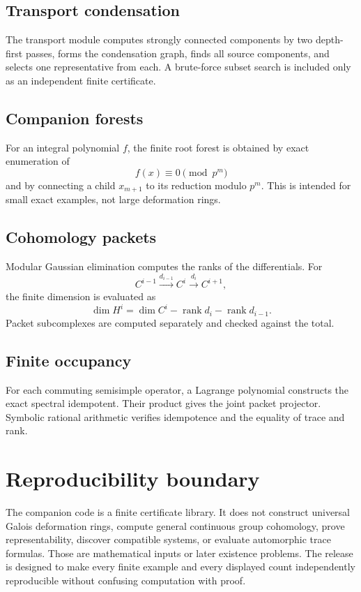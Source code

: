 \documentclass[11pt]{article}
\theoremstyle{definition}
\theoremstyle{remark}
\newcommand{\rank}{\operatorname{rank}}
\begin{document}
\subsection{Transport condensation}

The transport module computes strongly connected components by two depth-first passes, forms the condensation graph, finds all source components, and selects one representative from each.  A brute-force subset search is included only as an independent finite certificate.

\subsection{Companion forests}

For an integral polynomial \(f\), the finite root forest is obtained by exact enumeration of
\[
f(x)\equiv0\pmod{p^m}
\]
and by connecting a child \(x_{m+1}\) to its reduction modulo \(p^m\).  This is intended for small exact examples, not large deformation rings.

\subsection{Cohomology packets}

Modular Gaussian elimination computes the ranks of the differentials.  For
\[
C^{i-1}\xrightarrow{d_{i-1}}C^i\xrightarrow{d_i}C^{i+1},
\]
the finite dimension is evaluated as
\[
\dim H^i
=
\dim C^i-\rank d_i-\rank d_{i-1}.
\]
Packet subcomplexes are computed separately and checked against the total.

\subsection{Finite occupancy}

For each commuting semisimple operator, a Lagrange polynomial constructs the exact spectral idempotent.  Their product gives the joint packet projector.  Symbolic rational arithmetic verifies idempotence and the equality of trace and rank.

\section{Reproducibility boundary}

The companion code is a finite certificate library.  It does not construct universal Galois deformation rings, compute general continuous group cohomology, prove representability, discover compatible systems, or evaluate automorphic trace formulas.  Those are mathematical inputs or later existence problems.  The release is designed to make every finite example and every displayed count independently reproducible without confusing computation with proof.
\end{document}
